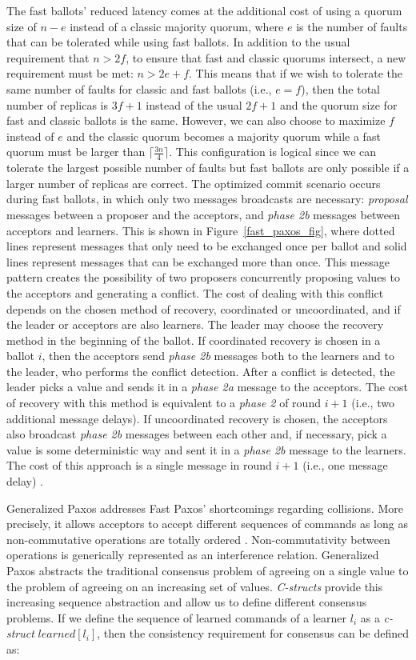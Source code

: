 The fast ballots' reduced latency comes at the additional cost of using a quorum size of $n-e$ instead of a classic majority quorum, where $e$ is the number of faults that can be tolerated while using fast ballots. In addition to the usual requirement that $n> 2f$, to ensure that fast and classic quorums intersect, a new requirement must be met: $n > 2e+f$. This means that if we wish to tolerate the same number of faults for classic and fast ballots (i.e., $e=f$), then the total number of replicas is $3f+1$ instead of the usual $2f+1$ and the quorum size for fast and classic ballots is the same. However, we can also choose to maximize $f$ instead of $e$ and the classic quorum becomes a majority quorum while a fast quorum must be larger than $\lceil \frac{3n}{4} \rceil$. This configuration is logical since we can tolerate the largest possible number of faults but fast ballots are only possible if a larger number of replicas are correct. The optimized commit scenario occurs during fast ballots, in which only two messages broadcasts are necessary: \textit{proposal} messages between a proposer and the acceptors, and \textit{phase 2b} messages between acceptors and learners. This is shown in Figure~\ref{fast_paxos_fig}, where dotted lines represent messages that only need to be exchanged once per ballot and solid lines represent messages that can be exchanged more than once. This message pattern creates the possibility of two proposers concurrently proposing values to the acceptors and generating a conflict. The cost of dealing with this conflict depends on the chosen method of recovery, coordinated or uncoordinated, and if the leader or acceptors are also learners. The leader may choose  the recovery method in the beginning of the ballot. If coordinated recovery is chosen in a ballot $i$, then the acceptors send \textit{phase 2b} messages both to the learners and to the leader, who performs the conflict detection. After a conflict is detected, the leader picks a value and sends it in a \textit{phase 2a} message to the acceptors. The cost of recovery with this method is equivalent to a \textit{phase 2} of round $i+1$ (i.e., two additional message delays). If uncoordinated recovery is chosen, the acceptors also broadcast \textit{phase 2b} messages between each other and, if necessary, pick a value is some deterministic way and sent it in a \textit{phase 2b} message to the learners. The cost of this approach is a single message in round $i+1$ (i.e., one message delay) \cite{Lamport2006}. \par
Generalized Paxos addresses Fast Paxos' shortcomings regarding collisions. More precisely, it allows acceptors to accept different sequences of commands as long as non-commutative operations are totally ordered \cite{Lamport2005}.  Non-commutativity between operations is generically represented as an interference relation. Generalized Paxos abstracts the traditional consensus problem of agreeing on a single value to the problem of agreeing on an increasing set of values. \textit{C-structs} provide this increasing sequence abstraction and allow us to define different consensus problems. If we define the sequence of learned commands of a learner $l_i$ as a \textit{c-struct} $learned[l_i]$, then the consistency requirement for consensus can be defined as:\par
